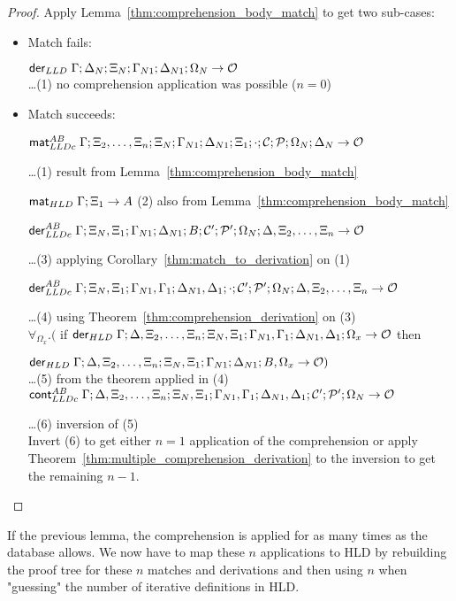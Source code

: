 \begin{proof}
Apply Lemma~\ref{thm:comprehension_body_match} to get two sub-cases:
   
\begin{itemize}[leftmargin=*]
   \item Match fails:
   
   
   $\mathsf{der}_{LLD} \; \Gamma; \Delta_N; \Xi_N; \Gamma_{N1}; \Delta_{N1}; \Omega_N
   \rightarrow \mathcal{O}$\\
   \dots \hfill (1) no comprehension application was possible ($n = 0$)\\
   
   \item Match succeeds:
   
   $\mathsf{mat}_{LLDc}^{AB} \; \Gamma; \Xi_2, \dotsc, \Xi_n; \Xi_N; \Gamma_{N1}; \Delta_{N1};
\Xi_1; \cdot; \mathcal{C}; \mathcal{P}; \Omega_N; \Delta_N \rightarrow \mathcal{O}$
   
   \dots \hfill (1) result from Lemma~\ref{thm:comprehension_body_match}
   
   $\mathsf{mat}_{HLD} \; \Gamma; \Xi_1 \rightarrow A$
   \hfill (2) also from Lemma~\ref{thm:comprehension_body_match}
   
   $\mathsf{der}_{LLDc}^{AB} \; \Gamma; \Xi_N, \Xi_1; \Gamma_{N1}; \Delta_{N1}; B; \mathcal{C'};
\mathcal{P'}; \Omega_N; \Delta, \Xi_2, \dotsc, \Xi_n \rightarrow \mathcal{O}$
   
   \dots \hfill (3) applying Corollary~\ref{thm:match_to_derivation} on (1)
   
   $\mathsf{der}_{LLDc}^{AB} \; \Gamma; \Xi_N, \Xi_1; \Gamma_{N1}, \Gamma_1; \Delta_{N1}, \Delta_1;
   \cdot; \mathcal{C'}; \mathcal{P'}; \Omega_N; \Delta, \Xi_2, \dotsc, \Xi_n \rightarrow \mathcal{O}$
   
   \dots \hfill (4) using Theorem~\ref{thm:comprehension_derivation} on (3)\\
   
   $\forall_{\Omega_x}. ($ if $\mathsf{der}_{HLD} \; \Gamma; \Delta, \Xi_2, \dotsc, \Xi_n; \Xi_N,
         \Xi_1; \Gamma_{N1}, \Gamma_1; \Delta_{N1}, \Delta_1; \Omega_x
         \rightarrow \mathcal{O}$ then
   
    \hspace*{0.5cm} $\mathsf{der}_{HLD} \; \Gamma; \Delta, \Xi_2, \dotsc, \Xi_n; \Xi_N, \Xi_1; \Gamma_{N1};
    \Delta_{N1}; B, \Omega_x \rightarrow \mathcal{O})$ \\ \dots \hfill (5)
   from the theorem applied in (4)\\
   
   $\mathsf{cont}_{LLDc}^{AB} \; \Gamma; \Delta, \Xi_2, \dotsc, \Xi_n; \Xi_N, \Xi_1; \Gamma_{N1},
   \Gamma_1; \Delta_{N1}, \Delta_1; \mathcal{C'}; \mathcal{P'}; \Omega_N \rightarrow \mathcal{O}$
   
   \dots \hfill (6) inversion of (5)\\
   
   Invert (6) to get either $n = 1$ application of the comprehension or apply Theorem~\ref{thm:multiple_comprehension_derivation} to the inversion to get the remaining $n-1$. 
\end{itemize}
\end{proof}

If the previous lemma, the comprehension is applied for as many times as the
database allows. We now have to map these $n$ applications to HLD by rebuilding
the proof tree for these $n$ matches and derivations and then using
$n$ when "guessing" the number of iterative definitions in HLD.
